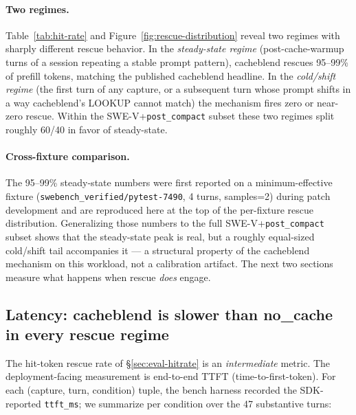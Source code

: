\paragraph{Two regimes.} Table~\ref{tab:hit-rate} and
Figure~\ref{fig:rescue-distribution} reveal two regimes with sharply
different rescue behavior. In the \emph{steady-state regime}
(post-cache-warmup turns of a session repeating a stable prompt
pattern), cacheblend rescues 95--99\% of prefill tokens, matching
the published cacheblend headline. In the \emph{cold/shift regime}
(the first turn of any capture, or a subsequent turn whose prompt
shifts in a way cacheblend's LOOKUP cannot match) the mechanism
fires zero or near-zero rescue. Within the SWE-V+\texttt{post\_compact} subset these two
regimes split roughly 60/40 in favor of steady-state.

\paragraph{Cross-fixture comparison.} The 95--99\% steady-state
numbers were first reported on a minimum-effective fixture
(\texttt{swebench\_verified/\allowbreak{}pytest-7490}, 4 turns, samples=2)
during patch development and are reproduced here at the top of the
per-fixture rescue distribution. Generalizing those
numbers to the full SWE-V+\texttt{post\_compact} subset shows that the steady-state peak is
real, but a roughly equal-sized cold/shift tail accompanies it ---
a structural property of the cacheblend mechanism on this workload,
not a calibration artifact. The next two sections measure what
happens when rescue \emph{does} engage.

\subsection{Latency: cacheblend is slower than no\_cache in every rescue regime}
\label{sec:eval-latency}

The hit-token rescue rate of \S\ref{sec:eval-hitrate} is an
\emph{intermediate} metric. The deployment-facing measurement is
end-to-end TTFT (time-to-first-token). For each (capture, turn,
condition) tuple, the bench harness recorded the SDK-reported
\texttt{ttft\_ms}; we summarize per condition over the 47 substantive
turns:

